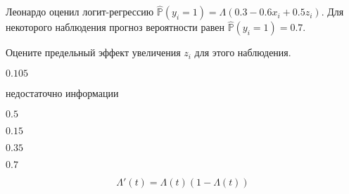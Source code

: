 
\begin{question}
Леонардо оценил логит-регрессию \(\hat{\mathbb{P}}(y_i = 1) = \Lambda ( 0.3 - 0.6 x_i + 0.5 z_i)\).
Для некоторого наблюдения прогноз вероятности равен \(\hat{\mathbb{P}}(y_i = 1) = 0.7\).

Оцените предельный эффект увеличения \(z_i\) для этого наблюдения.
\begin{answerlist}
  \item \(0.105\)
  \item недостаточно информации
  \item \(0.5\)
  \item \(0.15\)
  \item \(0.35\)
  \item \(0.7\)
\end{answerlist}
\end{question}

\begin{solution}
\[
\Lambda'(t) = \Lambda(t)(1 - \Lambda(t))
\]
\end{solution}


